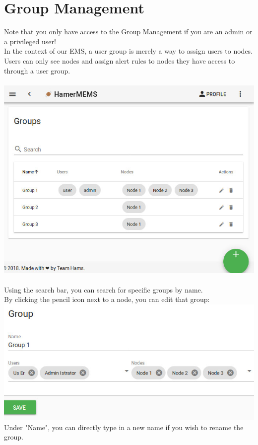 \documentclass[twoside,a4paper]{refart}
\begin{document}
\section{Group Management}
Note that you only have access to the Group Management if you are an admin or a privileged user!\\
In the context of our EMS, a user group is merely a way to assign users to nodes. Users can only see nodes and assign alert rules to nodes they have access to through a user group.\\ \\
\includegraphics[width=\linewidth]{groupmanagement.jpeg} \\  \\
Using the search bar, you can search for specific groups by name.\\
By clicking the pencil icon next to a node, you can edit that group: \\
\includegraphics[width=\linewidth]{groupedit.jpeg} \\
Under "Name", you can directly type in a new name if you wish to rename the group. \\
\end{document}
